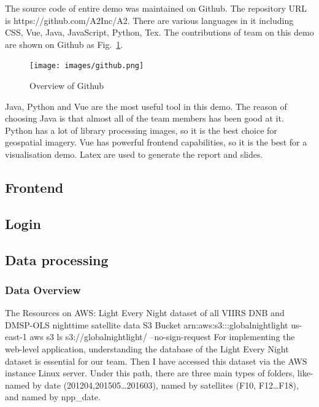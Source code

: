 \documentclass[conference]{IEEEtran}
\begin{document}
	The source code of entire demo was maintained on Github. The repository URL is https://github.com/A2Inc/A2. There are various languages in it including 
	CSS, Vue, Java, JavaScript, Python, Tex. The contributions of team on this demo are shown on Github as Fig.~\ref{fig3}.
	
	\begin{figure}[htbp]
		\centerline{\texttt{[image: images/github.png]}}
		\caption{Overview of Github}
		\label{fig3}
	\end{figure}
	
	Java, Python and Vue are the most useful tool in this demo. The reason of choosing Java is that almost all of the team members has been good at it. Python 
	has a lot of library processing images, so it is the best choice for geospatial imagery. Vue has powerful frontend capabilities, so it is the best for a 
	visualisation demo. Latex are used to generate the report and slides.
	
	\subsection{Frontend}
	
	\subsection{Login}
	
	\subsection{Data processing}
	\subsubsection{Data Overview}
    The Resources on AWS: 
	Light Every Night dataset of all VIIRS DNB and DMSP-OLS nighttime satellite data
	S3 Bucket
	arn:aws:s3:::globalnightlight
	us-east-1
	aws s3 ls s3://globalnightlight/ --no-sign-request
	For implementing the web-level application, understanding the database of the Light Every Night dataset is essential for our team. Then I have accessed this dataset via the AWS instance Linux server. 
	Under this path, there are three main types of folders, like-named by date (201204,201505…201603), named by satellites (F10, F12…F18), and named by npp_date.
\end{document}
